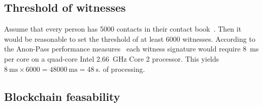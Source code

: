 \subsection{Threshold of witnesses}

Assume that every person has 5000 contacts in their contact 
book~\cite{DifficultyOfPrivateContactDiscovery}.
Then it would be reasonable to set the threshold of at least 6000 witnesses.
According to the Anon-Pass performance measures~\cite{AnonPass} each witness 
signature would require \SI{8}{\milli\second} per core on a quad-core Intel 
\SI{2.66}{\giga\hertz} Core 2 processor.
This yields \(
  \SI{8}{\milli\second}\times 6000 = \SI{48000}{\milli\second} = 
  \SI{48}{\second}.
\) of processing.

\subsection{Blockchain feasability}